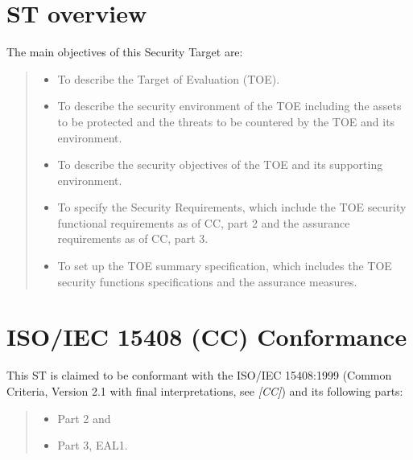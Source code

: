 \documentclass[10pt,a4paper,english]{book}
\begin{document}

\hypertarget{st-overview}{}
\section{ST overview}

The main objectives of this Security Target are:
\begin{quote}
\begin{itemize}
\item {} 
To describe the Target of Evaluation (TOE).

\item {} 
To describe the security environment of the TOE including the assets to
be protected and the threats to be countered by the TOE and its
environment.

\item {} 
To describe the security objectives of the TOE and its supporting
environment.

\item {} 
To specify the Security Requirements, which include the TOE security
functional requirements as of CC, part 2 and the assurance requirements as
of CC, part 3.

\item {} 
To set up the TOE summary specification, which includes the TOE
security functions specifications and the assurance measures.

\end{itemize}
\end{quote}



\hypertarget{iso-iec-15408-cc-conformance}{}
\section{ISO/IEC 15408 (CC) Conformance}

This ST is claimed to be conformant with the ISO/IEC 15408:1999 (Common
Criteria, Version 2.1 with final interpretations, see \emph{{[}CC]}) and its following
parts:
\begin{quote}
\begin{itemize}
\item {} 
Part 2 and

\item {} 
Part 3, EAL1.

\end{itemize}
\end{quote}
\end{document}
